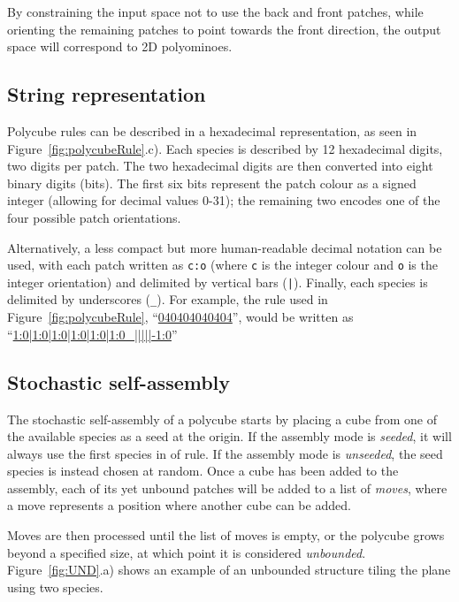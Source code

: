 By constraining the input space not to use the back and front patches, while orienting the remaining patches to point towards the front direction, the output space will correspond to 2D polyominoes.

\subsection{String representation}
\label{sec:string_repr}

Polycube rules can be described in a hexadecimal representation, as seen in Figure~\ref{fig:polycubeRule}.c). Each species is described by 12 hexadecimal digits, two digits per patch. The two hexadecimal digits are then converted into eight binary digits (bits). The first six bits represent the patch colour as a signed integer (allowing for decimal values 0-31); the remaining two encodes one of the four possible patch orientations.

Alternatively, a less compact but more human-readable decimal notation can be used, with each patch written as \texttt{c:o} (where \texttt{c} is the integer colour and \texttt{o} is the integer orientation) and delimited by vertical bars (\texttt{|}). Finally, each species is delimited by underscores (\texttt{\_}). For example, the rule used in Figure~\ref{fig:polycubeRule}, ``\href{https://akodiat.github.io/polycubes?rule=040404040404000000000084}{040404040404}'', would be written as ``\href{https://akodiat.github.io/polycubes?decRule=1:0|1:0|1:0|1:0|1:0|1:0_|||||-1:0}{1:0|1:0|1:0|1:0|1:0|1:0\_|||||-1:0}''

\subsection{Stochastic self-assembly}
\label{sec:stochastic_assembly}

The stochastic self-assembly of a polycube starts by placing a cube from one of the available species as a seed at the origin. If the assembly mode is \emph{seeded}, it will always use the first species in of rule. If the assembly mode is \emph{unseeded}, the seed species is instead chosen at random. Once a cube has been added to the assembly, each of its yet unbound patches will be added to a list of \emph{moves}, where a move represents a position where another cube can be added.

Moves are then processed until the list of moves is empty, or the polycube grows beyond a specified size, at which point it is considered \emph{unbounded}. Figure~\ref{fig:UND}.a) shows an example of an unbounded structure tiling the plane using two species.

